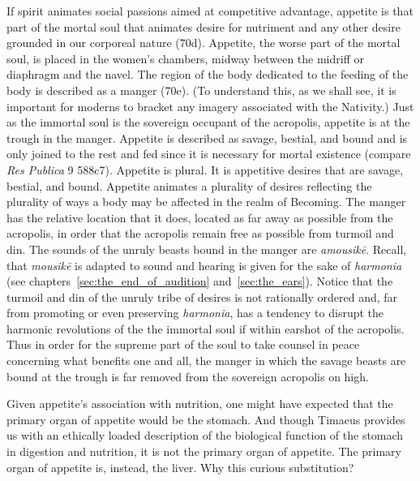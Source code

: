 If spirit animates social passions aimed at competitive advantage, appetite is that part of the mortal soul that animates desire for nutriment and any other desire grounded in our corporeal nature (70d). Appetite, the worse part of the mortal soul, is placed in the women's chambers, midway between the midriff or diaphragm and the navel. The region of the body dedicated to the feeding of the body is described as a manger (70e). (To understand this, as we shall see, it is important for moderns to bracket any imagery associated with the Nativity.) Just as the immortal soul is the sovereign occupant of the acropolis, appetite is at the trough in the manger. Appetite is described as savage, bestial, and bound and is only joined to the rest and fed since it is necessary for mortal existence (compare \emph{Res Publica} 9 588c7). Appetite is plural. It is appetitive desires that are savage, bestial, and bound. Appetite animates a plurality of desires reflecting the plurality of ways a body may be affected in the realm of Becoming. The manger has the relative location that it does, located as far away as possible from the acropolis, in order that the acropolis remain free as possible from turmoil and din. The sounds of the unruly beasts bound in the manger are \emph{amousikē}. Recall, that \emph{mousikē} is adapted to sound and hearing is given for the sake of \emph{harmonia} (see chapters~\ref{sec:the_end_of_audition} and~\ref{sec:the_ears}). Notice that the turmoil and din of the unruly tribe of desires is not rationally ordered and, far from promoting or even preserving \emph{harmonia}, has a tendency to disrupt the harmonic revolutions of the the immortal soul if within earshot of the acropolis. Thus in order for the supreme part of the soul to take counsel in peace concerning what benefits one and all, the manger in which the savage beasts are bound at the trough is far removed from the sovereign acropolis on high.

Given appetite's association with nutrition, one might have expected that the primary organ of appetite would be the stomach. And though Timaeus provides us with an ethically loaded description of the biological function of the stomach in digestion and nutrition, it is not the primary organ of appetite. The primary organ of appetite is, instead, the liver. Why this curious substitution?

